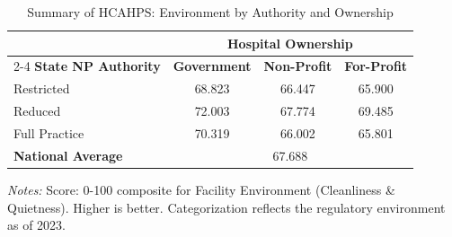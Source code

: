 \begin{table}[htbp]
    \centering
    \caption{Summary of HCAHPS: Environment by Authority and Ownership}
    \label{tab:hcahps_grp3_own}
    \vspace{0.2cm}
    \begin{tabular}{lccc}
        \toprule
        & \multicolumn{3}{c}{\textbf{Hospital Ownership}} \\
        \cmidrule(lr){2-4}
        \textbf{State NP Authority} & \textbf{Government} & \textbf{Non-Profit} & \textbf{For-Profit} \\
        \midrule
        Restricted & 68.823 & 66.447 & 65.900 \\
        Reduced & 72.003 & 67.774 & 69.485 \\
        Full Practice & 70.319 & 66.002 & 65.801 \\
        \midrule
        \textbf{National Average} & \multicolumn{3}{c}{67.688} \\
        \bottomrule
    \end{tabular}
    \vspace{0.1cm}
    \begin{minipage}{0.85\textwidth}
        \footnotesize \textit{Notes:} Score: 0-100 composite for Facility Environment (Cleanliness \& Quietness). Higher is better. Categorization reflects the regulatory environment as of 2023.
    \end{minipage}
\end{table}